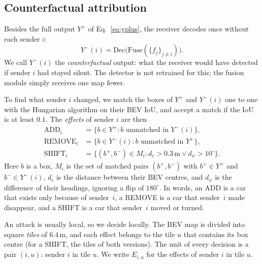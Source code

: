 \documentclass[conference]{IEEEtran}
\begin{document}


\subsection{Counterfactual attribution}
\label{sec:cf}
Besides the full output $Y^{+}$ of Eq.~\eqref{eq:yplus}, the receiver decodes once without each sender $i$:
\begin{equation}
Y^{-}(i)=\mathrm{Dec}\big(\mathrm{Fuse}(\{f_j\}_{j\neq i})\big).
\label{eq:cf}
\end{equation}
We call $Y^{-}(i)$ the \emph{counterfactual} output: what the receiver would have detected if sender $i$ had
stayed silent. The detector is not retrained for this; the fusion module simply receives one map fewer.

To find what sender $i$ changed, we match the boxes of $Y^{+}$ and $Y^{-}(i)$ one to one with the Hungarian
algorithm on their BEV IoU, and accept a match if the IoU is at least
$0.1$. The \emph{effects} of sender $i$ are then
\begin{equation}
\begin{split}
\mathrm{ADD}_i&=\{b\in Y^{+} : b \text{ unmatched in } Y^{-}(i)\},\\
\mathrm{REMOVE}_i&=\{b\in Y^{-}(i) : b \text{ unmatched in } Y^{+}\},\\
\mathrm{SHIFT}_i&=\{(b^{+},b^{-})\in M_i : d_c>0.3\,\text{m} \lor d_\psi>10^\circ\}.
\end{split}
\label{eq:effects}
\end{equation}
Here $b$ is a box, $M_i$ is the set of matched pairs $(b^{+},b^{-})$ with $b^{+}\in Y^{+}$ and
$b^{-}\in Y^{-}(i)$, $d_c$ is the distance between their BEV centres, and $d_\psi$ is the difference of their
headings, ignoring a flip of $180^\circ$. In words, an ADD is a car that exists only because of sender~$i$, a
REMOVE is a car that sender~$i$ made disappear, and a SHIFT is a car that sender~$i$ moved or turned.

An attack is usually local, so we decide locally. The BEV map is divided into square \emph{tiles} of $6.4$\,m,
and each effect belongs to the tile $u$ that contains its box centre (for a SHIFT, the tiles of both versions).
The unit of every decision is a pair $(i,u)$: sender $i$ in tile $u$. We write $E_{i,u}$ for the effects of
sender $i$ in tile $u$.
\end{document}

